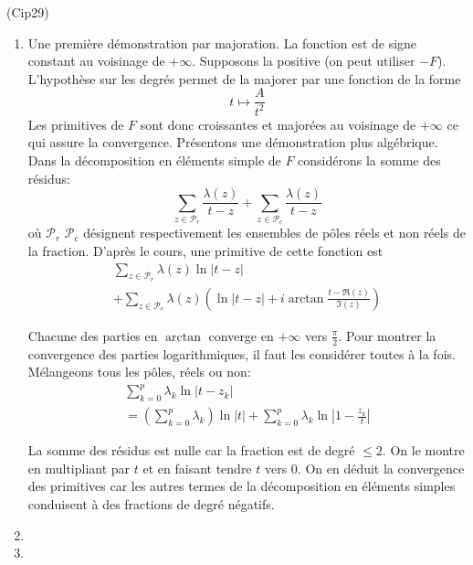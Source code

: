 \begin{tiny}(Cip29)\end{tiny}
\begin{enumerate}
 \item Une première démonstration par majoration. La fonction est de signe constant au voisinage de $+\infty$. Supposons la positive (on peut utiliser $-F$). L'hypothèse sur les degrés permet de la majorer par une fonction de la forme
\begin{displaymath}
 t\mapsto \frac{A}{t^2}
\end{displaymath}
Les primitives de $F$ sont donc croissantes et majorées au voisinage de $+\infty$ ce qui assure la convergence.\newline
Présentons une démonstration plus algébrique. 
Dans la décomposition en éléments simple de $F$ considérons la somme des résidus:
\begin{displaymath}
 \sum _{z\in \mathcal{P}_r}\frac{\lambda(z)}{t-z} 
+ \sum _{z\in \mathcal{P}_c}\frac{\lambda(z)}{t-z}
\end{displaymath}
où $\mathcal{P}_r$ $\mathcal{P}_c$ désignent respectivement les ensembles de pôles réels et non réels de la fraction.
D'après le cours, une primitive de cette fonction est
\begin{multline*}
 \sum _{z\in \mathcal{P}_r}\lambda(z) \ln|t-z| \\
+ \sum _{z\in \mathcal{P}_c}\lambda(z)\left(  \ln|t-z|+i\arctan\frac{t-\Re(z)}{\Im(z)}\right) 
\end{multline*}

Chacune des parties en $\arctan$ converge en $+\infty$ vers $\frac{\pi}{2}$. Pour montrer la convergence des parties logarithmiques, il faut les considérer toutes à la fois. Mélangeons tous les pôles, réels ou non:
\begin{multline*}
 \sum_{k=0}^{p}\lambda_k\ln|t-z_k| \\
= \left( \sum_{k=0}^{p}\lambda_k\right) \ln|t|
+ \sum_{k=0}^{p}\lambda_k\ln|1-\frac{z_k}{t}|
\end{multline*}

La somme des résidus est nulle car la fraction est de degré $\leq 2$. On le montre en multipliant par $t$ et en faisant tendre $t$ vers $0$. On en déduit la convergence des primitives car les autres termes de la décomposition en éléments simples conduisent à des fractions de degré négatifs.
 \item
 \item 
\end{enumerate}
 

